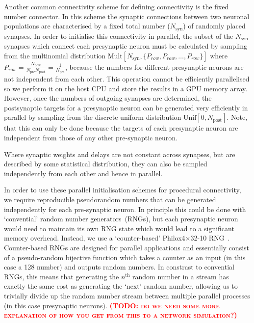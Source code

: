 \documentclass[9pt,twocolumn,twoside,lineno]{pnas-new}
\newcommand{\todo}[1]{\textbf{\textsc{\textcolor{red}{(TODO: #1)}}}}
\begin{document}
Another common connectivity scheme for defining connectivity is the fixed number connector.
In this scheme the synaptic connections between two neuronal populations are characterised by a fixed total number ($N_{\text{syn}}$) of randomly placed synapses.
In order to initialise this connectivity in parallel, the subset of the $N_{\text{syn}}$ synapses which connect each presynaptic neuron must be calculated by sampling from the multinomial distribution $\text{Mult}[N_{\text{syn}}, \{P_{row}, P_{row}, \ldots, P_{row}\}]$ where $P_{row} = \frac{N_{\text{post}}}{N_{\text{pre}} N_{\text{post}}} =  \frac{1}{N_{\text{pre}}} $, because the numbers for different presynaptic neurons are not independent from each other.
This operation cannot be efficiently parallelised so we perform it on the host CPU and store the results in a GPU memory array.
However, once the numbers of outgoing synapses are determined, the postsynaptic targets for a presynaptic neuron can be generated very efficiently in parallel by sampling from the discrete uniform distribution $\text{Unif}[0, N_{\text{post}}]$.
Note, that this can only be done because the targets of each presynaptic neuron are independent from those of any other pre-synaptic neuron.

Where synaptic weights and delays are not constant across synapses, but are described by some statistical distribution, they can also be sampled independently from each other and hence in parallel.
%

In order to use these parallel initialisation schemes for procedural connectivity, we require reproducible pseudorandom numbers that can be generated independently for each pre-synaptic neuron.
In principle this could be done with `convential' random number generators~(RNGs), but each presynaptic neuron would need to maintain its own RNG state which would lead to a significant memory overhead.
Instead, we use a `counter-based' Philox4$\times$32-10 RNG~\citep{Salmon2011}.
Counter-based RNGs are designed for parallel applications and essentially consist of a pseudo-random bijective function which takes a counter as an input (in this case a \SI{128}{\bit} number) and outputs random numbers.
In constrast to convential RNGs, this means that generating the $n^\text{th}$ random number in a stream has exactly the same cost as generating the `next' random number, allowing us to trivially divide up the random number stream between multiple parallel processes (in this case presynaptic neurons).
\todo{do we need some more explanation of how you get from this to a network simulation?}
\end{document}
